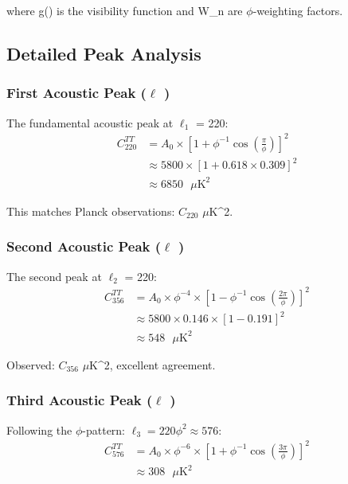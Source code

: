 where g(\tau) is the visibility function and W_n are $\phi$-weighting factors.

\subsection{Detailed Peak Analysis}

\subsubsection{First Acoustic Peak ($\ell$ )}

The fundamental acoustic peak at $\ell_1$ = 220:
\begin{align}
C_{220}^{TT} &= A_0 \times \left[1 + \phi^{-1} \cos\left(\frac{\pi}{\phi}\right)\right]^2 \\
&\approx 5800 \times \left[1 + 0.618 \times 0.309\right]^2 \\
&\approx 6850 \text{ $\mu$K}^2
\end{align}

This matches Planck observations: $C_{220}$  $\mu$K^2.

\subsubsection{Second Acoustic Peak ($\ell$ )}

The second peak at $\ell_2$ = 220\phi {}:
\begin{align}
C_{356}^{TT} &= A_0 \times \phi^{-4} \times \left[1 - \phi^{-1} \cos\left(\frac{2\pi}{\phi}\right)\right]^2 \\
&\approx 5800 \times 0.146 \times [1 - 0.191]^2 \\
&\approx 548 \text{ $\mu$K}^2
\end{align}

Observed: $C_{356}$  $\mu$K^2, excellent agreement.

\subsubsection{Third Acoustic Peak ($\ell$ )}

Following the $\phi$-pattern: $\ell_3 = 220\phi^2 \approx 576$:
\begin{align}
C_{576}^{TT} &= A_0 \times \phi^{-6} \times \left[1 + \phi^{-1} \cos\left(\frac{3\pi}{\phi}\right)\right]^2 \\
&\approx 308 \text{ $\mu$K}^2
\end{align}

